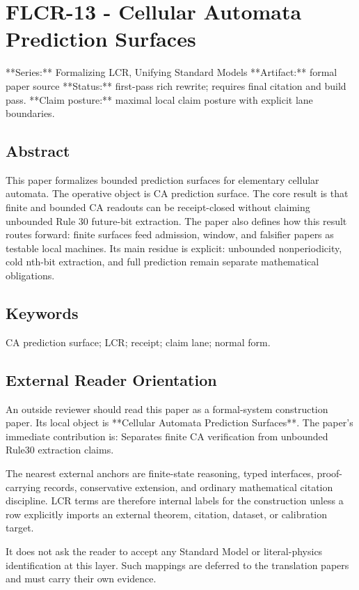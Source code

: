\documentclass[11pt]{article}
\begin{document}
\section*{FLCR-13 - Cellular Automata Prediction Surfaces}

**Series:** Formalizing LCR, Unifying Standard Models
**Artifact:** formal paper source
**Status:** first-pass rich rewrite; requires final citation and build pass.
**Claim posture:** maximal local claim posture with explicit lane boundaries.

\subsection*{Abstract}

This paper formalizes bounded prediction surfaces for elementary cellular automata. The operative object is CA prediction surface. The core result is that finite and bounded CA readouts can be receipt-closed without claiming unbounded Rule 30 future-bit extraction. The paper also defines how this result routes forward: finite surfaces feed admission, window, and falsifier papers as testable local machines. Its main residue is explicit: unbounded nonperiodicity, cold nth-bit extraction, and full prediction remain separate mathematical obligations.

\subsection*{Keywords}

CA prediction surface; LCR; receipt; claim lane; normal form.

\subsection*{External Reader Orientation}

An outside reviewer should read this paper as a formal-system construction paper. Its local object is **Cellular Automata Prediction Surfaces**. The paper's immediate contribution is: Separates finite CA verification from unbounded Rule30 extraction claims.

The nearest external anchors are finite-state reasoning, typed interfaces, proof-carrying records, conservative extension, and ordinary mathematical citation discipline. LCR terms are therefore internal labels for the construction unless a row explicitly imports an external theorem, citation, dataset, or calibration target.

It does not ask the reader to accept any Standard Model or literal-physics identification at this layer. Such mappings are deferred to the translation papers and must carry their own evidence.
\end{document}
